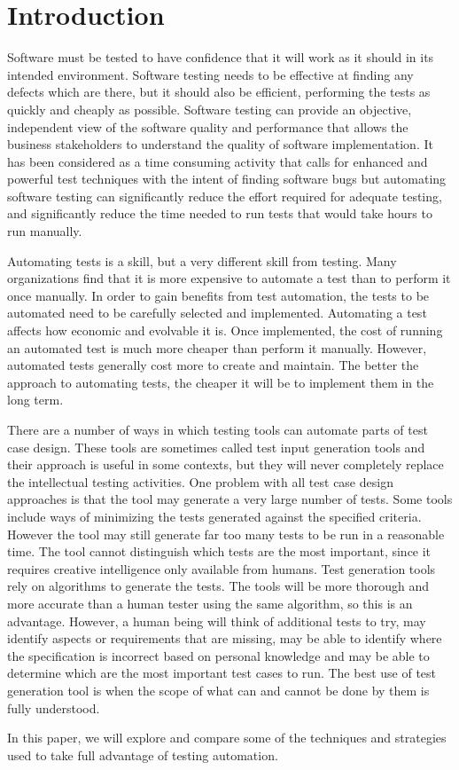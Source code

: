 \section{Introduction}

Software must be tested to have confidence that it will work as it should in
its intended environment. Software testing needs to be effective at finding
any defects which are there, but it should also be efficient, performing the
tests as quickly and cheaply as possible. Software testing can provide an
objective, independent view of the software quality and performance that allows
the business stakeholders to understand the quality of software implementation.
It has been considered as a time consuming activity that calls for enhanced and
powerful test techniques with the intent of finding software bugs but automating
software testing can significantly reduce the effort required for adequate
testing, and significantly reduce the time needed to run tests that would take
hours to run manually.

Automating tests is a skill, but a very different skill from testing. Many
organizations find that it is more expensive to automate a test than to perform
it once manually. In order to gain benefits from test automation, the tests to
be automated need to be carefully selected and implemented. Automating a test
affects how economic and evolvable it is. Once implemented, the cost of running
an automated test is much more cheaper than perform it manually. However,
automated tests generally cost more to create and maintain. The better the
approach to automating tests, the cheaper it will be to implement them in the
long term.

There are a number of ways in which testing tools can automate parts of test
case design. These tools are sometimes called test input generation tools and
their approach is useful in some contexts, but they will never completely
replace the intellectual testing activities. One problem with all test case
design approaches is that the tool may generate a very large number of tests.
Some tools include ways of minimizing the tests generated against the specified
criteria. However the tool may still generate far too many tests to be run in a
reasonable time. The tool cannot distinguish which tests are the most important,
since it requires creative intelligence only available from humans. Test
generation tools rely on algorithms to generate the tests. The tools will be
more thorough and more accurate than a human tester using the same algorithm,
so this is an advantage. However, a human being will think of additional tests
to try, may identify aspects or requirements that are missing, may be able to
identify where the specification is incorrect based on personal knowledge and
may be able to determine which are the most important test cases to run. The
best use of test generation tool is when the scope of what can and cannot be
done by them is fully understood.

In this paper, we will explore and compare some of the techniques and strategies
used to take full advantage of testing automation.